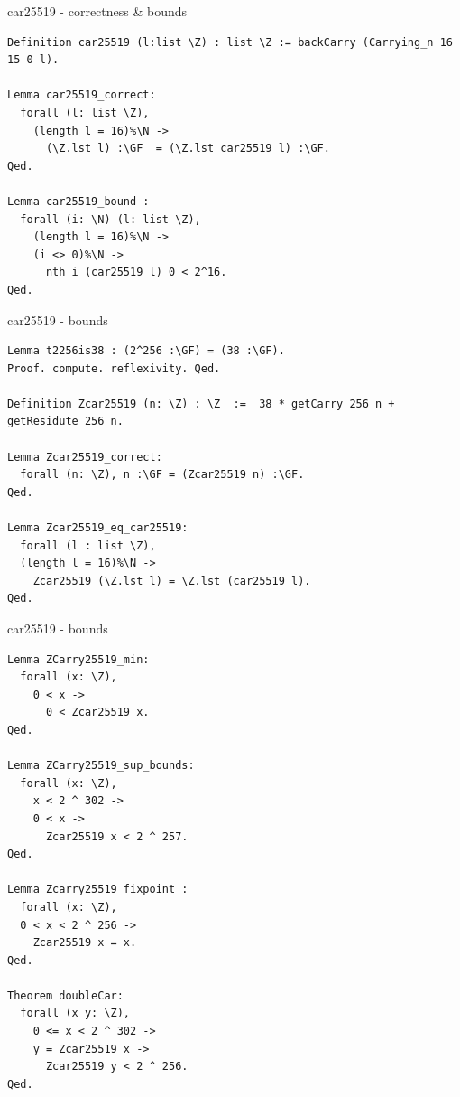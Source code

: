\documentclass[8pt]{beamer}
\begin{document}
%
%

\begin{frame}[fragile]{car25519 - correctness \& bounds}
  \begin{center}
\begin{lstlisting}[language=CoqD, caption=car25519 | Proofs of correctness, label=cod:languageC171]
Definition car25519 (l:list \Z) : list \Z := backCarry (Carrying_n 16 15 0 l).

Lemma car25519_correct:
  forall (l: list \Z),
    (length l = 16)%\N ->
      (\Z.lst l) :\GF  = (\Z.lst car25519 l) :\GF.
Qed.

Lemma car25519_bound :
  forall (i: \N) (l: list \Z),
    (length l = 16)%\N ->
    (i <> 0)%\N ->
      nth i (car25519 l) 0 < 2^16.
Qed.
\end{lstlisting}
  \end{center}
\end{frame}



%
%

\begin{frame}[fragile]{car25519 - bounds}
  \begin{center}
\begin{lstlisting}[language=CoqD, caption=car25519, label=cod:languageC181]
Lemma t2256is38 : (2^256 :\GF) = (38 :\GF).
Proof. compute. reflexivity. Qed.

Definition Zcar25519 (n: \Z) : \Z  :=  38 * getCarry 256 n +  getResidute 256 n.

Lemma Zcar25519_correct:
  forall (n: \Z), n :\GF = (Zcar25519 n) :\GF.
Qed.

Lemma Zcar25519_eq_car25519:
  forall (l : list \Z),
  (length l = 16)%\N ->
    Zcar25519 (\Z.lst l) = \Z.lst (car25519 l).
Qed.
\end{lstlisting}

  \end{center}
\end{frame}


%
%

\begin{frame}[fragile]{car25519 - bounds}
  \begin{center}
\begin{lstlisting}[language=CoqD, caption=car25519, label=cod:languageC191]
Lemma ZCarry25519_min:
  forall (x: \Z),
    0 < x ->
      0 < Zcar25519 x.
Qed.

Lemma ZCarry25519_sup_bounds:
  forall (x: \Z),
    x < 2 ^ 302 ->
    0 < x ->
      Zcar25519 x < 2 ^ 257.
Qed.

Lemma Zcarry25519_fixpoint :
  forall (x: \Z),
  0 < x < 2 ^ 256 ->
    Zcar25519 x = x.
Qed.

Theorem doubleCar:
  forall (x y: \Z),
    0 <= x < 2 ^ 302 ->
    y = Zcar25519 x ->
      Zcar25519 y < 2 ^ 256.
Qed.
\end{lstlisting}

  \end{center}
\end{frame}
\end{document}
